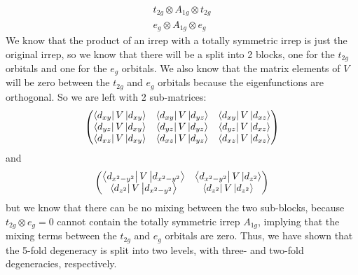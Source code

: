 \documentclass{article}
\begin{document}
\begin{align}
    t_{2g} \otimes A_{1g} \otimes t_{2g} \\
    e_g \otimes A_{1g} \otimes e_g
\end{align}
We know that the product of an irrep with a totally symmetric irrep is just the original irrep, so we know that there will be a split into 2 blocks, one for the $t_{2g}$ orbitals and one for the $e_g$ orbitals. We also know that the matrix elements of $V$ will be zero between the $t_{2g}$ and $e_g$ orbitals because the eigenfunctions are orthogonal. So we are left with 2 sub-matrices:
\begin{equation}
    \begin{pmatrix}
    \bra{d_{xy}}V\ket{d_{xy}} & \bra{d_{xy}}V\ket{d_{yz}} & \bra{d_{xy}}V\ket{d_{xz}}\\
    \bra{d_{yz}}V\ket{d_{xy}} & \bra{d_{yz}}V\ket{d_{yz}} & \bra{d_{yz}}V\ket{d_{xz}}\\
    \bra{d_{xz}}V\ket{d_{xy}} & \bra{d_{xz}}V\ket{d_{yz}} & \bra{d_{xz}}V\ket{d_{xz}}
    \end{pmatrix}
\end{equation}
and
\begin{equation}
    \begin{pmatrix}
    \bra{d_{x^2-y^2}}V\ket{d_{x^2-y^2}} & \bra{d_{x^2-y^2}}V\ket{d_{z^2}}\\
    \bra{d_{z^2}}V\ket{d_{x^2-y^2}} & \bra{d_{z^2}}V\ket{d_{z^2}}
    \end{pmatrix}
\end{equation}
but we know that there can be no mixing between the two sub-blocks, because $t_{2g}\otimes e_g = 0$ cannot contain the totally symmetric irrep $A_{1g}$, implying that the mixing terms between the $t_{2g}$ and $e_g$ orbitals are zero. Thus, we have shown that the 5-fold degeneracy is split into two levels, with three- and two-fold degeneracies, respectively.\\
\end{document}
